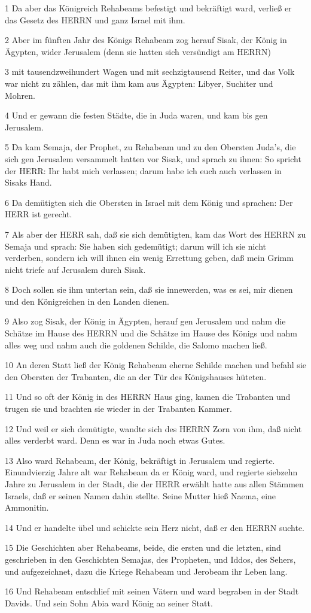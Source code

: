 \par 1 Da aber das Königreich Rehabeams befestigt und bekräftigt ward, verließ er das Gesetz des HERRN und ganz Israel mit ihm.
\par 2 Aber im fünften Jahr des Königs Rehabeam zog herauf Sisak, der König in Ägypten, wider Jerusalem (denn sie hatten sich versündigt am HERRN)
\par 3 mit tausendzweihundert Wagen und mit sechzigtausend Reiter, und das Volk war nicht zu zählen, das mit ihm kam aus Ägypten: Libyer, Suchiter und Mohren.
\par 4 Und er gewann die festen Städte, die in Juda waren, und kam bis gen Jerusalem.
\par 5 Da kam Semaja, der Prophet, zu Rehabeam und zu den Obersten Juda's, die sich gen Jerusalem versammelt hatten vor Sisak, und sprach zu ihnen: So spricht der HERR: Ihr habt mich verlassen; darum habe ich euch auch verlassen in Sisaks Hand.
\par 6 Da demütigten sich die Obersten in Israel mit dem König und sprachen: Der HERR ist gerecht.
\par 7 Als aber der HERR sah, daß sie sich demütigten, kam das Wort des HERRN zu Semaja und sprach: Sie haben sich gedemütigt; darum will ich sie nicht verderben, sondern ich will ihnen ein wenig Errettung geben, daß mein Grimm nicht triefe auf Jerusalem durch Sisak.
\par 8 Doch sollen sie ihm untertan sein, daß sie innewerden, was es sei, mir dienen und den Königreichen in den Landen dienen.
\par 9 Also zog Sisak, der König in Ägypten, herauf gen Jerusalem und nahm die Schätze im Hause des HERRN und die Schätze im Hause des Königs und nahm alles weg und nahm auch die goldenen Schilde, die Salomo machen ließ.
\par 10 An deren Statt ließ der König Rehabeam eherne Schilde machen und befahl sie den Obersten der Trabanten, die an der Tür des Königshauses hüteten.
\par 11 Und so oft der König in des HERRN Haus ging, kamen die Trabanten und trugen sie und brachten sie wieder in der Trabanten Kammer.
\par 12 Und weil er sich demütigte, wandte sich des HERRN Zorn von ihm, daß nicht alles verderbt ward. Denn es war in Juda noch etwas Gutes.
\par 13 Also ward Rehabeam, der König, bekräftigt in Jerusalem und regierte. Einundvierzig Jahre alt war Rehabeam da er König ward, und regierte siebzehn Jahre zu Jerusalem in der Stadt, die der HERR erwählt hatte aus allen Stämmen Israels, daß er seinen Namen dahin stellte. Seine Mutter hieß Naema, eine Ammonitin.
\par 14 Und er handelte übel und schickte sein Herz nicht, daß er den HERRN suchte.
\par 15 Die Geschichten aber Rehabeams, beide, die ersten und die letzten, sind geschrieben in den Geschichten Semajas, des Propheten, und Iddos, des Sehers, und aufgezeichnet, dazu die Kriege Rehabeam und Jerobeam ihr Leben lang.
\par 16 Und Rehabeam entschlief mit seinen Vätern und ward begraben in der Stadt Davids. Und sein Sohn Abia ward König an seiner Statt.

